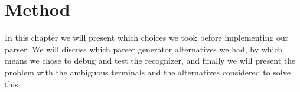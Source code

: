 \chapter{Method}

In this chapter we will present which choices we took before implementing our parser. We will discuss which parser generator alternatives we had, by which means we chose to debug and test the recognizer, and finally we will present the problem with the ambiguous terminals and the alternatives considered to solve this.




